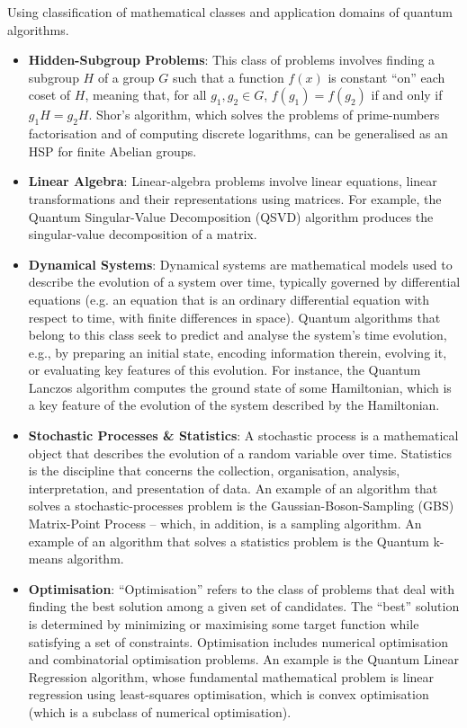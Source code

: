 Using \citeauthor{Arnault:2024} \citeyear{Arnault:2024} \cite{Arnault:2024} classification of mathematical classes
and application domains of quantum algorithms.

\begin{itemize}
\item \textbf{Hidden-Subgroup Problems}: This class of problems involves finding a subgroup $H$ of a group $G$ such
  that a function $f(x)$ is constant “on” each coset of $H$, meaning that, for all $g_1, g_2 \in G$, $f(g_1) = f(g_2)$
  if and only if $g_1H = g_2H$.
  Shor’s algorithm, which solves the problems of prime-numbers factorisation and of computing discrete logarithms,
  can be generalised as an HSP for finite Abelian groups.

\item \textbf{Linear Algebra}: Linear-algebra problems involve linear equations, linear transformations and their
  representations using matrices.
  For example, the Quantum Singular-Value Decomposition (QSVD) algorithm produces the singular-value decomposition of a matrix.

\item \textbf{Dynamical Systems}:  Dynamical systems are mathematical models used to describe the evolution of a
  system over time, typically governed by differential equations (e.g. an equation that is an ordinary differential
  equation with respect to time, with finite differences in space).
  Quantum algorithms that belong to this class seek to predict and analyse the system’s time evolution, e.g., by
  preparing an initial state, encoding information therein, evolving it, or evaluating key features of this evolution.
  For instance, the Quantum Lanczos algorithm computes the ground state of some Hamiltonian, which is a key feature of
  the evolution of the system described by the Hamiltonian.
  
\item \textbf{Stochastic Processes \& Statistics}:  A stochastic process is a mathematical object that describes the
  evolution of a random variable over time. Statistics is the discipline that concerns the collection, organisation,
  analysis, interpretation, and presentation of data.
  An example of an algorithm that solves a stochastic-processes problem is the Gaussian-Boson-Sampling (GBS)
  Matrix-Point Process – which, in addition, is a sampling algorithm. An example of an algorithm that solves a
  statistics problem is the Quantum k-means algorithm.

\item \textbf{Optimisation}: “Optimisation” refers to the class of problems that deal with finding the best solution
  among a given set of candidates. The “best” solution is determined by minimizing or maximising some target function
  while satisfying a set of constraints.
  Optimisation includes numerical optimisation and combinatorial optimisation problems. An example is the
  Quantum Linear Regression algorithm, whose fundamental mathematical problem is linear regression using least-squares
  optimisation, which is convex optimisation (which is a subclass of numerical optimisation).


\end{itemize}
